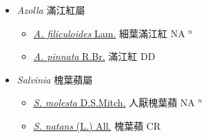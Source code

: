 
  \begin{itemize}
 \item[] \textit{Azolla} 滿江紅屬
                    
  \begin{itemize}
        \item[] \href{http://www.theplantlist.org/tpl1.1/search?q=Azolla+filiculoides}{\textit{A. filiculoides} Lam.}   細葉滿江紅 NA $^n$
        \item[] \href{http://www.theplantlist.org/tpl1.1/search?q=Azolla+pinnata}{\textit{A. pinnata} R.Br.}   滿江紅 DD
  \end{itemize}
 \item[] \textit{Salvinia} 槐葉蘋屬
                    
  \begin{itemize}
        \item[] \href{http://www.theplantlist.org/tpl1.1/search?q=Salvinia+molesta}{\textit{S. molesta} D.S.Mitch.}   人厭槐葉蘋 NA $^n$
        \item[] \href{http://www.theplantlist.org/tpl1.1/search?q=Salvinia+natans}{\textit{S. natans} (L.) All.}   槐葉蘋 CR
  \end{itemize}
  \end{itemize}
